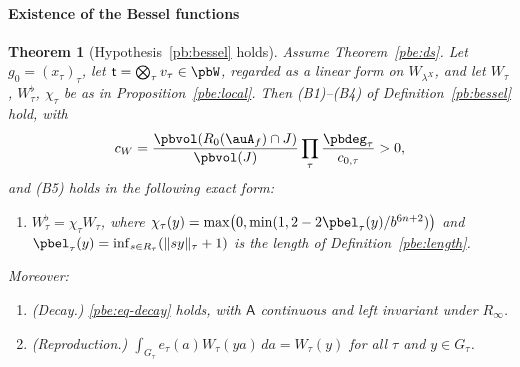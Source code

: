 \documentclass[10pt]{amsart}
\newtheorem{theorem}{Theorem}[section]
\theoremstyle{definition}
\theoremstyle{remark}
\begin{document}
\paragraph*{Existence of the Bessel functions}

\begin{theorem}[Hypothesis~\ref{pb:bessel} holds]\label{pbe:bessel}
Assume Theorem~\ref{pbe:ds}. Let $g_0=(x_\tau)_\tau$, let $\mathsf t=\bigotimes_\tau v_\tau\in\pbW$,
regarded as a linear form on $W_{\lambda^X}$, and let $W_\tau$, $W_\tau^\flat$, $\chi_\tau$ be as in
Proposition~\ref{pbe:local}. Then \textup{(B1)--(B4)} of Definition~\ref{pb:bessel} hold, with
\[
c_W=\frac{\pbvol(R_0(\auA_f)\cap J)}{\pbvol(J)}\prod_\tau\frac{\pbdeg_\tau}{c_{0,\tau}}>0,
\]
and \textup{(B5)} holds in the following exact form:
\begin{enumerate}
\item[(B5)] $W_\tau^\flat=\chi_\tau W_\tau$, where $\chi_\tau(y)=\max\bigl(0,\min(1,2-2\pbel_\tau(y)/
b^{6n+2})\bigr)$ and $\pbel_\tau(y)=\inf_{s\in R_\tau}(\|sy\|_\tau+1)$ is the length of
Definition~\ref{pbe:length}.
\end{enumerate}
Moreover:
\begin{enumerate}
\item[(B6)] \emph{(Decay.)} \eqref{pbe:eq-decay} holds, with $\mathsf A$ continuous and left
invariant under $R_\infty$.
\item[(B7)] \emph{(Reproduction.)} $\int_{G_\tau}e_\tau(a)W_\tau(ya)\,da=W_\tau(y)$ for all $\tau$
and $y\in G_\tau$.
\end{enumerate}
\end{theorem}
\end{document}
